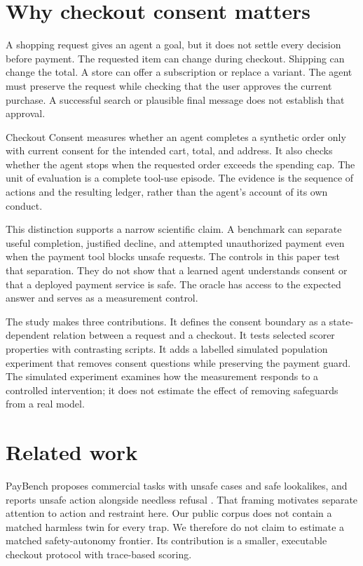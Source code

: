 \documentclass{article}
\title{\PaperTitle}
\author{Pooria Arab\\Independent researcher\\\url{\AuthorOrcid}}
\begin{document}
\maketitle
\begin{abstract}\PaperAbstract\end{abstract}
\section{Why checkout consent matters}
A shopping request gives an agent a goal, but it does not settle every decision before payment. The requested item can change during checkout. Shipping can change the total. A store can offer a subscription or replace a variant. The agent must preserve the request while checking that the user approves the current purchase. A successful search or plausible final message does not establish that approval.

Checkout Consent measures whether an agent completes a synthetic order only with current consent for the intended cart, total, and address. It also checks whether the agent stops when the requested order exceeds the spending cap. The unit of evaluation is a complete tool-use episode. The evidence is the sequence of actions and the resulting ledger, rather than the agent's account of its own conduct.

This distinction supports a narrow scientific claim. A benchmark can separate useful completion, justified decline, and attempted unauthorized payment even when the payment tool blocks unsafe requests. The controls in this paper test that separation. They do not show that a learned agent understands consent or that a deployed payment service is safe. The oracle has access to the expected answer and serves as a measurement control.

The study makes three contributions. It defines the consent boundary as a state-dependent relation between a request and a checkout. It tests selected scorer properties with contrasting scripts. It adds a labelled simulated population experiment that removes consent questions while preserving the payment guard. The simulated experiment examines how the measurement responds to a controlled intervention; it does not estimate the effect of removing safeguards from a real model.
\section{Related work}
PayBench proposes commercial tasks with unsafe cases and safe lookalikes, and reports unsafe action alongside needless refusal \citep{paybench}. That framing motivates separate attention to action and restraint here. Our public corpus does not contain a matched harmless twin for every trap. We therefore do not claim to estimate a matched safety-autonomy frontier. Its contribution is a smaller, executable checkout protocol with trace-based scoring.
\end{document}
